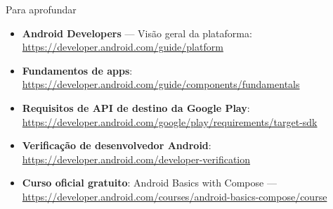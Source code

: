 \documentclass[aspectratio=169,10pt]{beamer}
\begin{document}
\begin{frame}{Para aprofundar}
  \small
  \begin{itemize}
    \item \textbf{Android Developers} --- Visão geral da plataforma: \url{https://developer.android.com/guide/platform}
    \item \textbf{Fundamentos de apps}: \url{https://developer.android.com/guide/components/fundamentals}
    \item \textbf{Requisitos de API de destino da Google Play}: \url{https://developer.android.com/google/play/requirements/target-sdk}
    \item \textbf{Verificação de desenvolvedor Android}: \url{https://developer.android.com/developer-verification}
    \item \textbf{Curso oficial gratuito}: Android Basics with Compose --- \url{https://developer.android.com/courses/android-basics-compose/course}
  \end{itemize}
\end{frame}

\end{document}
